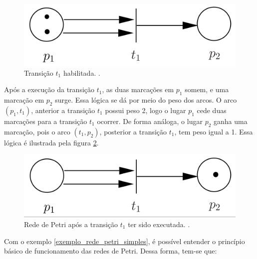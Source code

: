 \documentclass[
	12pt,				%
	openright,			%
	oneside,			%
	a4paper,			%
	english,			%
	brazil				%
	]{abntex2}
\begin{document}
\newpage

\begin{figure}[ht] 
	\centering
	\includegraphics[scale=0.3]{exemplo_simples_rede_petri_marcacao_p1.png}
	\caption[Rede de Petri Simples]{Transição $t_{1}$ habilitada. \textcite{CassandrasLafortune08}.}
	\label{fig:rede_petri_simples_ex_02}
\end{figure}

Após a execução da transição $t_{1}$, as duas marcações em $p_{1}$ somem, e uma marcação em $p_{2}$ surge. Essa lógica se dá por meio do peso dos arcos. O arco $(p_{1},t_{1})$, anterior a transição $t_{1}$ possui peso 2, logo o lugar $p_{1}$ cede duas marcações para a transição $t_{1}$ ocorrer. De forma análoga, o lugar $p_{2}$ ganha uma marcação, pois o arco $(t_{1},p_{2})$, posterior a transição $t_{1}$, tem peso igual a 1. Essa lógica é ilustrada pela figura \ref{fig:rede_petri_simples_ex_03}.

\begin{figure}[ht] 
	\centering
	\includegraphics[scale=0.3]{exemplo_simples_rede_petri_marcacao_p2.png}
	\caption[Rede de Petri Simples]{Rede de Petri após a transição $t_{1}$ ter sido executada. \textcite{CassandrasLafortune08}.}
	\label{fig:rede_petri_simples_ex_03}
\end{figure}

Com o exemplo \ref{exemplo_rede_petri_simples}, é possível entender o princípio básico de funcionamento das redes de Petri. Dessa forma, tem-se que:
\end{document}
